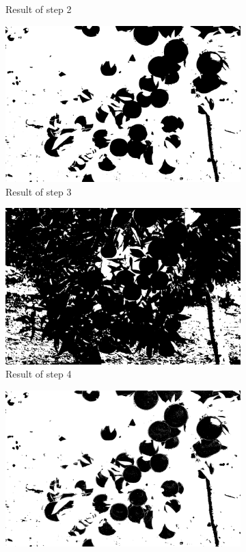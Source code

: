 \documentclass[conference]{IEEEtran}
\begin{document}
\begin{figure}[H]
\begin{subfigure}{.3\linewidth}
  	\caption{Result of step 2}
  \end{subfigure}\par\medskip
  
  \begin{subfigure}{.3\linewidth}
  	\includegraphics[width=\linewidth]{citrus1/citrus1_cr.jpg}\hfill
     	\caption{Result of step 3}
  \end{subfigure}
  \begin{subfigure}{.3\linewidth}
  	\includegraphics[width=\linewidth]{citrus1/citrus1_cb.jpg}\hfill
     	\caption{Result of step 4}
  \end{subfigure}
  \begin{subfigure}{.3\linewidth}
  	\includegraphics[width=\linewidth]{citrus1/citrus1_mask.jpg}

\end{subfigure}
\end{figure}
\end{document}
